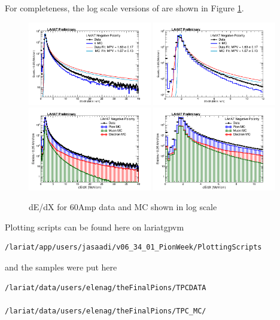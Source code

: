 For completeness, the log scale versions of are shown in Figure \ref{fig:dEdXLogScale}.

\begin{figure}[htb]
\centering
\includegraphics[width=0.48\textwidth]{Studies/Figures/dEdX_Fit_v2.png}
\includegraphics[width=0.48\textwidth]{Studies/Figures/dEdX_Fit_v3.png}
\includegraphics[width=0.48\textwidth]{Studies/Figures/dEdX_stacked_v2.png}
\includegraphics[width=0.48\textwidth]{Studies/Figures/dEdX_stacked_v3.png}
\caption[]{ dE/dX for 60Amp data and MC shown in log scale  } \label{fig:dEdXLogScale}
\end{figure}

Plotting scripts can be found here on lariatgpvm \begin{verbatim}
/lariat/app/users/jasaadi/v06_34_01_PionWeek/PlottingScripts
\end{verbatim} and the samples were put here \begin{verbatim}
/lariat/data/users/elenag/theFinalPions/TPCDATA

/lariat/data/users/elenag/theFinalPions/TPC_MC/
\end{verbatim}

